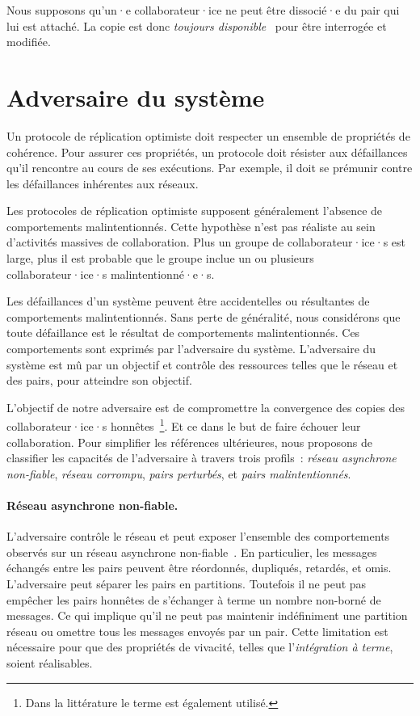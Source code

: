 Nous supposons qu'un·e collaborateur·ice ne peut être dissocié·e du pair qui lui est attaché.
La copie est donc \emph{toujours disponible}~\autocite{mahajan_2011_cac} pour être interrogée et modifiée.


\section{Adversaire du système}

Un protocole de réplication optimiste doit respecter un ensemble de propriétés de cohérence.
Pour assurer ces propriétés, un protocole doit résister aux défaillances qu'il rencontre au cours de ses exécutions.
Par exemple, il doit se prémunir contre les défaillances inhérentes aux réseaux.

Les protocoles de réplication optimiste supposent généralement l'absence de comportements malintentionnés.
Cette hypothèse n'est pas réaliste au sein d'activités massives de collaboration.
Plus un groupe de collaborateur·ice·s est large, plus il est probable que le groupe inclue un ou plusieurs collaborateur·ice·s malintentionné·e·s.

Les défaillances d'un système peuvent être accidentelles ou résultantes de comportements malintentionnés.
Sans perte de généralité, nous considérons que toute défaillance est le résultat de comportements malintentionnés.
Ces comportements sont exprimés par l'adversaire du système.
L'adversaire du système est mû par un objectif et contrôle des ressources telles que le réseau et des pairs, pour atteindre son objectif.

L'objectif de notre adversaire est de compromettre la convergence des copies des collaborateur·ice·s honnêtes~\footnote{Dans la littérature le terme  est également utilisé.}.
Et ce dans le but de faire échouer leur collaboration.
Pour simplifier les références ultérieures, nous proposons de classifier les capacités de l'adversaire à travers trois profils~: \emph{réseau asynchrone non-fiable}, \emph{réseau corrompu}, \emph{pairs perturbés}, et \emph{pairs malintentionnés}.

\paragraph{Réseau asynchrone non-fiable.} L'adversaire contrôle le réseau et peut exposer l'ensemble des comportements observés sur un réseau asynchrone non-fiable~\autocite{lynch_1996_asyncnet}.
En particulier, les messages échangés entre les pairs peuvent être réordonnés, dupliqués, retardés, et omis.
L'adversaire peut séparer les pairs en partitions.
Toutefois il ne peut pas empêcher les pairs honnêtes de s'échanger à terme un nombre non-borné de messages.
Ce qui implique qu'il ne peut pas maintenir indéfiniment une partition réseau ou omettre tous les messages envoyés par un pair.
Cette limitation est nécessaire pour que des propriétés de vivacité, telles que l'\emph{intégration à terme}, soient réalisables.

